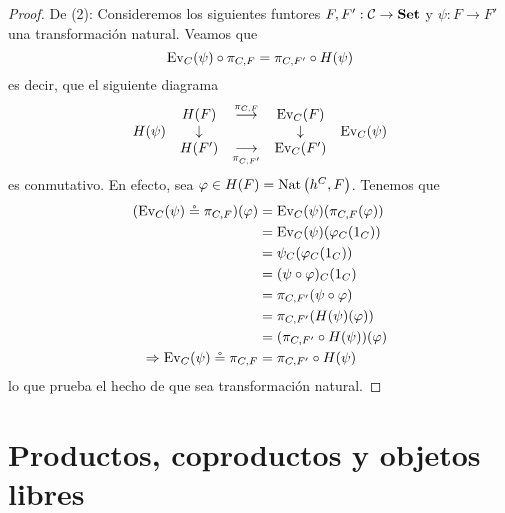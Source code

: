 \documentclass[12pt]{report}
\newcounter{it}
\theoremstyle{largebreak}
\newcommand\cf[3]{\ensuremath{#1:#2\rightarrow#3}}
\newcommand{\Cat}[1]{\ensuremath{\textup{\textbf{#1}}}}
\newcommand{\Ev}{\ensuremath{\textup{Ev}}}
\begin{document}
\begin{proof}
        De (2): Consideremos los siguientes funtores $\cf{F,F'}{\mathcal{C}}{\Cat{Set}}$ y $\cf{\psi}{F}{F'}$ una transformación natural. Veamos que
        \begin{equation*}
            \Ev_C(\psi)\circ\pi_{ C,F}=\pi_{ C,F'}\circ H(\psi)
        \end{equation*}
        es decir, que el siguiente diagrama
        \begin{equation*}
            \begin{array}[pos]{rcccl}
                & H(F) & \overset{\pi_{ C,F}}{\longrightarrow} & \Ev_C(F) & \\
                H(\psi) & \downarrow & & \downarrow & \Ev_C(\psi) \\
               & H(F') & \underset{\pi_{ C,F'}}{\longrightarrow} & \Ev_C(F') & \\
            \end{array}
        \end{equation*}
        es conmutativo. En efecto, sea $\varphi\in H(F)=\textup{Nat}\left(h^C,F\right)$. Tenemos que
        \begin{equation*}
            \begin{split}
                (\Ev_C(\psi)\circeq\pi_{ C,F})(\varphi)&=\Ev_C(\psi)(\pi_{ C,F}(\varphi))\\
                &=\Ev_C(\psi)(\varphi_C(1_C))\\
                &=\psi_C(\varphi_C(1_C))\\
                &=(\psi\circ\varphi)_C(1_C)\\
                &=\pi_{ C,F'}(\psi\circ\varphi)\\
                &=\pi_{C,F'}(H(\psi)(\varphi))\\
                &=(\pi_{C,F'}\circ H(\psi))(\varphi)\\
                \Rightarrow \Ev_C(\psi)\circeq\pi_{ C,F}&=\pi_{C,F'}\circ H(\psi)\\
            \end{split}
        \end{equation*}
        lo que prueba el hecho de que sea transformación natural.
    \end{proof}

    \section{Productos, coproductos y objetos libres}

    
\end{document}

